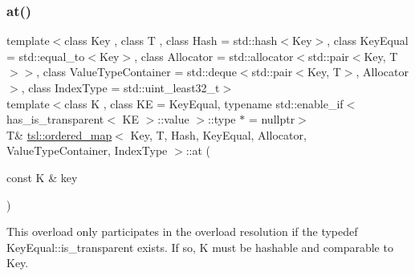 \subsubsection{\texorpdfstring{at()}{at()}\hspace{0.1cm}{\footnotesize\ttfamily [3/6]}}
{\footnotesize\ttfamily template$<$class Key , class T , class Hash  = std\+::hash$<$\+Key$>$, class Key\+Equal  = std\+::equal\+\_\+to$<$\+Key$>$, class Allocator  = std\+::allocator$<$std\+::pair$<$\+Key, T$>$$>$, class Value\+Type\+Container  = std\+::deque$<$std\+::pair$<$\+Key, T$>$, Allocator$>$, class Index\+Type  = std\+::uint\+\_\+least32\+\_\+t$>$ \\
template$<$class K , class KE  = Key\+Equal, typename std\+::enable\+\_\+if$<$ has\+\_\+is\+\_\+transparent$<$ K\+E $>$\+::value $>$\+::type $\ast$  = nullptr$>$ \\
T\& \mbox{\hyperlink{classtsl_1_1ordered__map}{tsl\+::ordered\+\_\+map}}$<$ Key, T, Hash, Key\+Equal, Allocator, Value\+Type\+Container, Index\+Type $>$\+::at (\begin{DoxyParamCaption}\item[{const K \&}]{key }\end{DoxyParamCaption})\hspace{0.3cm}{\ttfamily [inline]}}

This overload only participates in the overload resolution if the typedef Key\+Equal\+::is\+\_\+transparent exists. If so, K must be hashable and comparable to Key. \mbox{\label{classtsl_1_1ordered__map_a478220509105133bdf3829887a16ea96}} 
